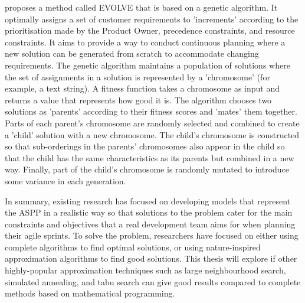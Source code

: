 \citet{greer2004software} proposes a method called EVOLVE that is based on a genetic algorithm. It optimally assigns a set of customer requirements to 'increments' according to the prioritisation made by the Product Owner, precedence constraints, and resource constraints. It aims to provide a way to conduct continuous planning where a new solution can be generated from scratch to accommodate changing requirements. The genetic algorithm maintains a population of solutions where the set of assignments in a solution is represented by a 'chromosome' (for example, a text string). A fitness function takes a chromosome as input and returns a value that represents how good it is. The algorithm chooses two solutions as 'parents' according to their fitness scores and 'mates' them together. Parts of each parent's chromosome are randomly selected and combined to create a 'child' solution with a new chromosome. The child's chromosome is constructed so that sub-orderings in the parents' chromosomes also appear in the child so that the child has the same characteristics as its parents but combined in a new way. Finally, part of the child's chromosome is randomly mutated to introduce some variance in each generation.

In summary, existing research has focused on developing models that represent the ASPP in a realistic way so that solutions to the problem cater for the main constraints and objectives that a real development team aims for when planning their agile sprints. To solve the problem, researchers have focused on either using complete algorithms to find optimal solutions, or using nature-inspired approximation algorithms to find good solutions. This thesis will explore if other highly-popular approximation techniques such as large neighbourhood search, simulated annealing, and tabu search can give good results compared to complete methods based on mathematical programming.